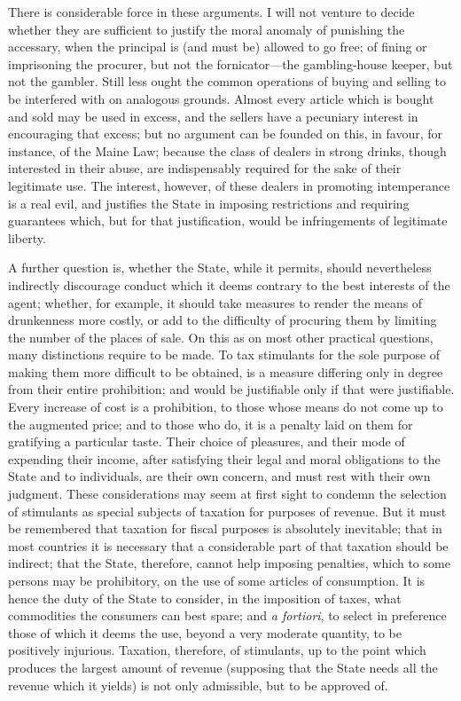 \documentclass[11pt,openany]{book}
\begin{document}
There is considerable force in these arguments. I will not venture to decide whether they are sufficient to justify the moral anomaly of punishing the accessary, when the principal is (and must be) allowed to go free; of fining or imprisoning the procurer, but not the fornicator---the gambling-house keeper, but not the gambler. Still less ought the common operations of buying and selling to be interfered with on analogous grounds. Almost every article which is bought and sold may be used in excess, and the sellers have a pecuniary interest in encouraging that excess; but no argument can be founded on this, in favour, for instance, of the Maine Law; because the class of dealers in strong drinks, though interested in their abuse, are indispensably required for the sake of their legitimate use. The interest, however, of these dealers in promoting intemperance is a real evil, and justifies the State in imposing restrictions and requiring guarantees which, but for that justification, would be infringements of legitimate liberty.

A further question is, whether the State, while it permits, should nevertheless indirectly discourage conduct which it deems contrary to the best interests of the agent; whether, for example, it should take measures to render the means of drunkenness more costly, or add to the difficulty of procuring them by limiting the number of the places of sale. On this as on most other practical questions, many distinctions require to be made. To tax stimulants for the sole purpose of making them more difficult to be obtained, is a measure differing only in degree from their entire prohibition; and would be justifiable only if that were justifiable. Every increase of cost is a prohibition, to those whose means do not come up to the augmented price; and to those who do, it is a penalty laid on them for gratifying a particular taste. Their choice of pleasures, and their mode of expending their income, after satisfying their legal and moral obligations to the State and to individuals, are their own concern, and must rest with their own judgment. These considerations may seem at first sight to condemn the selection of stimulants as special subjects of taxation for purposes of revenue. But it must be remembered that taxation for fiscal purposes is absolutely inevitable; that in most countries it is necessary that a considerable part of that taxation should be indirect; that the State, therefore, cannot help imposing penalties, which to some persons may be prohibitory, on the use of some articles of consumption. It is hence the duty of the State to consider, in the imposition of taxes, what commodities the consumers can best spare; and \emph{a fortiori}, to select in preference those of which it deems the use, beyond a very moderate quantity, to be positively injurious. Taxation, therefore, of stimulants, up to the point which produces the largest amount of revenue (supposing that the State needs all the revenue which it yields) is not only admissible, but to be approved of.
\end{document}
